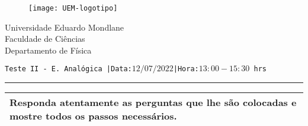 \documentclass[11pt,a4paper,titlepage]{article}
\author{Bartolomeu J. Ubisse}
\begin{document}
\begin{figure}[htb]

\centering
\texttt{[image: UEM-logotipo]}
\end{figure}
\centering
{ \Large Universidade Eduardo Mondlane}\\[0.3cm] 
\large Faculdade de Ci\^encias\\[0.2cm]
 \large Departamento de F\'isica\\[0.5cm]



\begin{flushleft}
\tt Teste II - E. Anal\'ogica\hspace{0.25cm} |Data:$12/07/2022$\hspace{0.25cm}|Hora:$13:00-15:30$ hrs\vspace{0.08cm}
\hrule
\end{flushleft}

 \begin{table}[htb]
\centering
\begin{tabular}{p{16.55cm}}
\hline
\cellcolor[gray]{0.95}
Responda atentamente as perguntas que lhe s\~ao colocadas e mostre todos os passos necess\'arios.\\
 \hline
\end{tabular}
\end{table}
\end{document}
